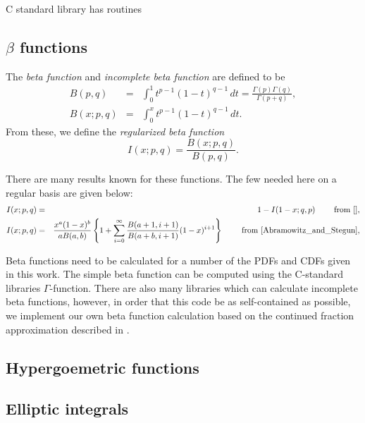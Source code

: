 C standard library has routines

\subsection{$\beta$ functions}

The {\em beta function} and {\em incomplete beta function} are defined
to be 
\begin{eqnarray}
  \label{eqn:beta}
  B(p,q)    & = & \int_0^1 t^{p-1} (1 - t)^{q-1} \, dt = \frac{\Gamma(p) \Gamma(q)}{\Gamma(p+q)}, \\
  \label{eqn:beta_inc}
  B(x; p,q) & = & \int_0^x t^{p-1} (1 - t)^{q-1} \, dt.
\end{eqnarray}
From these, we define the {\em regularized beta function}
\begin{equation}
  \label{eqn:beta_reg}
   I(x; p,q) = \frac{ B(x; p,q)}{B(p,q)}.
\end{equation}

There are many results known for these functions. The few needed here
on a regular basis are given below:
\begin{eqnarray}
  I(x; p, q) & = & 1 - I(1-x; q, p) \hspace{7mm} \mbox{ from \cite{}}, \\
  I(x; p, q) & = &              
\frac{x^a (1-x)^b}{a B(a,b)}  \left\{ 
               1 +
               \sum_{i=0}^{\infty} \frac{B(a+1,i+1)}{B(a+b,i+1)} (1-x)^{i+1}
           \right\} 
     \hspace{7mm} \mbox{ from \cite[26.5.4]{Abramowitz_and_Stegun}}, \\
\end{eqnarray}
 

Beta functions need to be calculated for a number of the PDFs and CDFs
given in this work. The simple beta function can be computed using the
C-standard libraries $\Gamma$-function. There are also many libraries
which can calculate incomplete beta functions, however, in order that
this code be as self-contained as possible, we implement our own beta
function calculation based on the continued fraction approximation
described in \cite{}.


\subsection{Hypergoemetric functions}


\subsection{Elliptic integrals}



